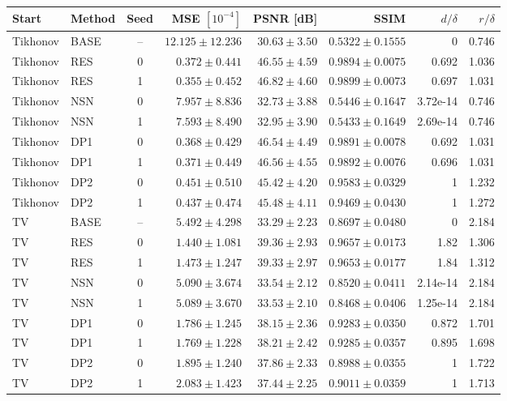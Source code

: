 \begingroup\small\setlength{\tabcolsep}{4pt}\renewcommand{\arraystretch}{1.1}
\begin{tabular}{@{}llcrrrrr@{}}
\toprule
Start & Method & Seed & MSE $[10^{-4}]$ & PSNR [dB] & SSIM & $d/\delta$ & $r/\delta$ \\ \midrule
Tikhonov & BASE & -- & $12.125\pm12.236$ & $30.63\pm3.50$ & $0.5322\pm0.1555$ & 0 & 0.746 \\
Tikhonov & RES & 0 & $0.372\pm0.441$ & $46.55\pm4.59$ & $0.9894\pm0.0075$ & 0.692 & 1.036 \\
Tikhonov & RES & 1 & $0.355\pm0.452$ & $46.82\pm4.60$ & $0.9899\pm0.0073$ & 0.697 & 1.031 \\
Tikhonov & NSN & 0 & $7.957\pm8.836$ & $32.73\pm3.88$ & $0.5446\pm0.1647$ & 3.72e-14 & 0.746 \\
Tikhonov & NSN & 1 & $7.593\pm8.490$ & $32.95\pm3.90$ & $0.5433\pm0.1649$ & 2.69e-14 & 0.746 \\
Tikhonov & DP1 & 0 & $0.368\pm0.429$ & $46.54\pm4.49$ & $0.9891\pm0.0078$ & 0.692 & 1.031 \\
Tikhonov & DP1 & 1 & $0.371\pm0.449$ & $46.56\pm4.55$ & $0.9892\pm0.0076$ & 0.696 & 1.031 \\
Tikhonov & DP2 & 0 & $0.451\pm0.510$ & $45.42\pm4.20$ & $0.9583\pm0.0329$ & 1 & 1.232 \\
Tikhonov & DP2 & 1 & $0.437\pm0.474$ & $45.48\pm4.11$ & $0.9469\pm0.0430$ & 1 & 1.272 \\
TV & BASE & -- & $5.492\pm4.298$ & $33.29\pm2.23$ & $0.8697\pm0.0480$ & 0 & 2.184 \\
TV & RES & 0 & $1.440\pm1.081$ & $39.36\pm2.93$ & $0.9657\pm0.0173$ & 1.82 & 1.306 \\
TV & RES & 1 & $1.473\pm1.247$ & $39.33\pm2.97$ & $0.9653\pm0.0177$ & 1.84 & 1.312 \\
TV & NSN & 0 & $5.090\pm3.674$ & $33.54\pm2.12$ & $0.8520\pm0.0411$ & 2.14e-14 & 2.184 \\
TV & NSN & 1 & $5.089\pm3.670$ & $33.53\pm2.10$ & $0.8468\pm0.0406$ & 1.25e-14 & 2.184 \\
TV & DP1 & 0 & $1.786\pm1.245$ & $38.15\pm2.36$ & $0.9283\pm0.0350$ & 0.872 & 1.701 \\
TV & DP1 & 1 & $1.769\pm1.228$ & $38.21\pm2.42$ & $0.9285\pm0.0357$ & 0.895 & 1.698 \\
TV & DP2 & 0 & $1.895\pm1.240$ & $37.86\pm2.33$ & $0.8988\pm0.0355$ & 1 & 1.722 \\
TV & DP2 & 1 & $2.083\pm1.423$ & $37.44\pm2.25$ & $0.9011\pm0.0359$ & 1 & 1.713 \\
\bottomrule
\end{tabular}\endgroup
